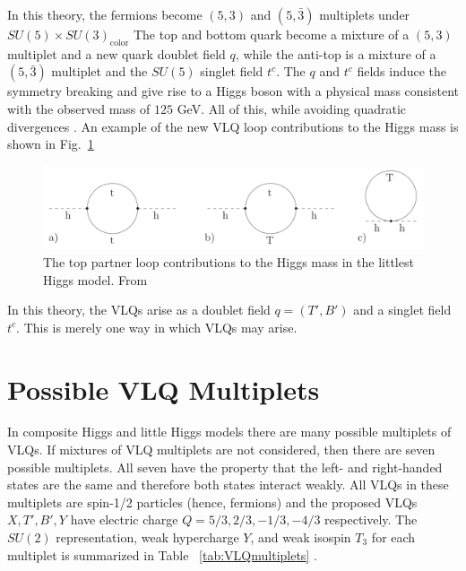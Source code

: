 In this theory, the fermions become $(5,3)$ and $(5,\bar{3})$ multiplets under $SU(5)\times SU(3)_{\textrm{color}}$ The top and bottom quark become a mixture of a $(5,3)$ multiplet and a new quark doublet field $q$, while the anti-top is a mixture of a $(5,\bar{3})$ multiplet and the $SU(5)$ singlet field $t^{c}$. The $q$ and $t^{c}$ fields induce the symmetry breaking and give rise to a Higgs boson with a physical mass consistent with the observed mass of $125$ GeV. All of this, while avoiding quadratic divergences \cite{littleHiggs}. An example of the new VLQ loop contributions to the Higgs mass is shown in Fig.~\ref{fig:tprimeLoop}

\begin{figure}[htb]
    \centering
    \includegraphics[width=14cm]{tprimeLoop.png}
    \caption{The top partner loop contributions to the Higgs mass in the littlest Higgs model. From \cite{TopPartner}}
    \label{fig:tprimeLoop}
\end{figure}

In this theory, the VLQs arise as a doublet field $q=(T', B')$ and a singlet field $t^{c}$. This is merely one way in which VLQs may arise.

\section{Possible VLQ Multiplets}

In composite Higgs and little Higgs models there are many possible multiplets of VLQs. If mixtures of VLQ multiplets are not considered, then there are seven possible multiplets. All seven have the property that the left- and right-handed states are the same and therefore both states interact weakly. All VLQs in these multiplets are spin-1/2 particles (hence, fermions) and the proposed VLQs $X,T',B',Y$ have electric charge $Q=5/3,2/3,-1/3,-4/3$ respectively. The $SU(2)$ representation, weak hypercharge $Y$, and weak isospin $T_{3}$ for each multiplet is summarized in Table ~\ref{tab:VLQmultiplets} \cite{VLQmultiplets, VLQHandbook}.

